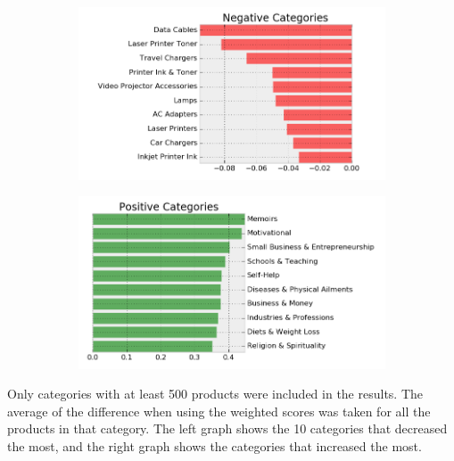 \documentclass[a4paper,10pt]{article}
\begin{document}
\begin{figure}[H]
\centering
\begin{subfigure}{.5\textwidth}
  \centering
  \includegraphics[width=1\linewidth]{change_by_category_neg.png}
  \label{fig:sub1}
\end{subfigure}%
\begin{subfigure}{.5\textwidth}
  \centering
  \includegraphics[width=1\linewidth]{change_by_category_pos.png}
  \label{fig:sub2}
\end{subfigure}
\label{fig:test}
\end{figure}

Only categories with at least 500 products were included in the results. The average of the difference when using the weighted scores was taken for all the products in that category. The left graph shows the 10 categories that decreased the most, and the right graph shows the categories that increased the most.
\end{document}
